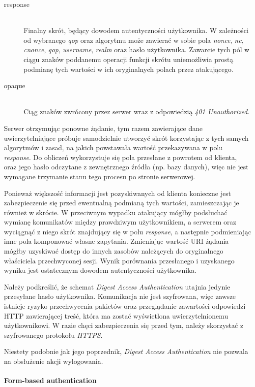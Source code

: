 \documentclass[11pt]{aghdpl}
\begin{document}
\begin{description}
\item[response] \hfill \\
Finalny skrót, będący dowodem autentyczności użytkownika. W zależności od wybranego \emph{qop} oraz algorytmu może zawierać w sobie pola \emph{nonce}, \emph{nc}, \emph{cnonce}, \emph{qop}, \emph{username}, \emph{realm} oraz hasło użytkownika. Zawarcie tych pól w ciągu znaków poddanemu operacji funkcji skrótu uniemożliwia prostą podmianę tych wartości w ich oryginalnych polach przez atakującego.
\item[opaque] \hfill \\
Ciąg znaków zwrócony przez serwer wraz z odpowiedzią \emph{401 Unauthorized}.
\end{description}

Serwer otrzymując ponowne żądanie, tym razem zawierające dane uwierzytelniające próbuje samodzielnie utworzyć skrót korzystając z tych samych algorytmów i zasad, na jakich powstawała wartość przekazywana w polu \emph{response}. Do obliczeń wykorzystuje się pola przesłane z powrotem od klienta, oraz jego hasło odczytane z zewnętrznego źródła (np. bazy danych), więc nie jest wymagane trzymanie stanu tego procesu po stronie serwerowej.

Ponieważ większość informacji jest pozyskiwanych od klienta konieczne jest zabezpieczenie się przed ewentualną podmianą tych wartości, zamieszczając je również w skrócie. W przeciwnym wypadku atakujący mógłby podsłuchać wymianę komunikatów między prawdziwym użytkownikiem, a serwerem oraz wyciągnąć z niego skrót znajdujący się w polu \emph{response}, a następnie podmieniając inne pola komponować własne zapytania. Zmieniając wartość URI żądania mógłby uzyskiwać dostęp do innych zasobów należących do oryginalnego właściciela przechwyconej sesji. Wynik porównania przesłanego i uzyskanego wyniku jest ostatecznym dowodem autentyczności użytkownika.

Należy podkreślić, że schemat \emph{Digest Access Authentication} utajnia jedynie przesyłane hasło użytkownika. Komunikacja nie jest szyfrowana, więc zawsze istnieje ryzyko przechwycenia pakietów oraz przeglądanie zawartości odpowiedzi HTTP zawierającej treść, która ma zostać wyświetlona uwierzytelnionemu użytkownikowi. W razie chęci zabezpieczenia się przed tym, należy skorzystać z szyfrowanego protokołu \emph{HTTPS}.

Niestety podobnie jak jego poprzednik, \emph{Digest Access Authentication} nie pozwala na obsłużenie akcji wylogowania.

\paragraph{Form-based authentication}
\end{document}
